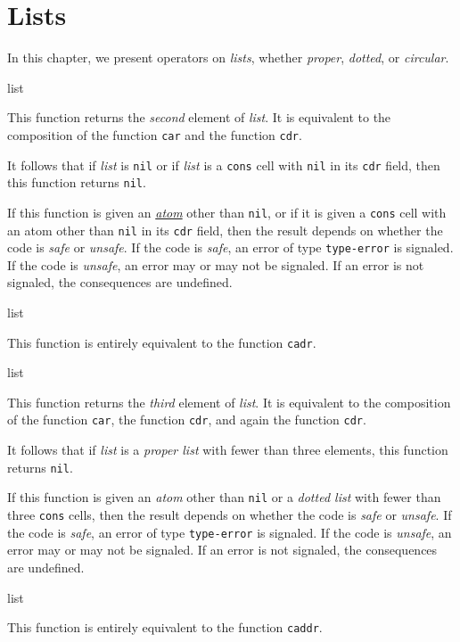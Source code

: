 \chapter{Lists}

In this chapter, we present operators on \emph{lists}, whether
\emph{proper}, \emph{dotted}, or \emph{circular}.  

 {list}

This function returns the \emph{second} element of \textit{list}.  It
is equivalent to the composition of the function \texttt{car} and the
function \texttt{cdr}.  

It follows that if \textit{list} is \texttt{nil} or if \textit{list}
is a \texttt{cons} cell with \texttt{nil} in its \texttt{cdr} field,
then this function returns \texttt{nil}.  

If this function is given an \hyperref[sec-atoms-and-lists]
{\emph{atom}} other than \texttt{nil}, or if it is given a
\texttt{cons} cell with an atom other than \texttt{nil} in its
\texttt{cdr} field, then the result depends on whether the code is
\emph{safe} or \emph{unsafe}.  If the code is \emph{safe}, an error of
type \texttt{type-error} is signaled.  If the code is \emph{unsafe},
an error may or may not be signaled.  If an error is not signaled, the
consequences are undefined.

 {list}

This function is entirely equivalent to the function \texttt{cadr}. 

 {list}

This function returns the \emph{third} element of \textit{list}.  It
is equivalent to the composition of the function \texttt{car}, the
function \texttt{cdr}, and again the function \texttt{cdr}.

It follows that if \textit{list} is a \emph{proper list} with fewer
than three elements, this function returns \texttt{nil}.

If this function is given an \emph{atom} other than \texttt{nil} or a
\emph{dotted list} with fewer than three \texttt{cons} cells, then the
result depends on whether the code is \emph{safe} or \emph{unsafe}.
If the code is \emph{safe}, an error of type \texttt{type-error} is
signaled.  If the code is \emph{unsafe}, an error may or may not be
signaled.  If an error is not signaled, the consequences are
undefined.

 {list}

This function is entirely equivalent to the function \texttt{caddr}. 

